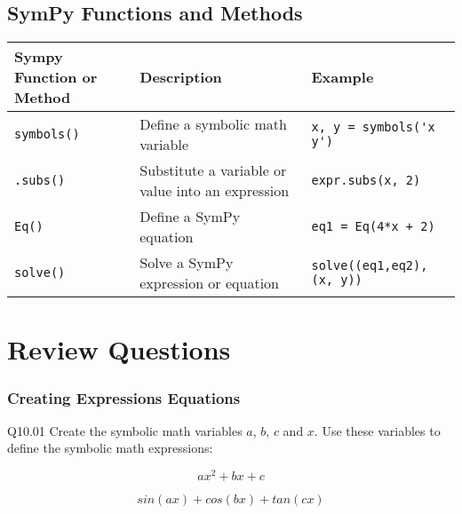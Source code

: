 \documentclass{book}
\newcommand{\passthrough}[1]{#1}
\begin{document}
    




    
        \hypertarget{sympy-functions-and-methods}{%
\subsection{SymPy Functions and
Methods}\label{sympy-functions-and-methods}}
    




    
        \begin{longtable}[]{@{}lll@{}}
\toprule
Sympy Function or Method & Description & Example\tabularnewline
\midrule
\endhead
\passthrough{\lstinline!symbols()!} & Define a symbolic math variable &
\passthrough{\lstinline!x, y = symbols('x y')!}\tabularnewline
\passthrough{\lstinline!.subs()!} & Substitute a variable or value into
an expression & \passthrough{\lstinline!expr.subs(x, 2)!}\tabularnewline
\passthrough{\lstinline!Eq()!} & Define a SymPy equation &
\passthrough{\lstinline!eq1 = Eq(4*x + 2)!}\tabularnewline
\passthrough{\lstinline!solve()!} & Solve a SymPy expression or equation
& \passthrough{\lstinline!solve((eq1,eq2), (x, y))!}\tabularnewline
\bottomrule
\end{longtable}
    




    
        \hypertarget{review-questions}{%
\section{Review Questions}\label{review-questions}}
    




    
        \hypertarget{creating-expressions-equations}{%
\subsubsection{Creating Expressions
Equations}\label{creating-expressions-equations}}
    




    
        Q10.01 Create the symbolic math variables \(a\), \(b\), \(c\) and \(x\).
Use these variables to define the symbolic math expressions:

\[ ax^2 + bx + c \]

\[ sin(ax) + cos(bx) + tan(cx) \]
\end{document}

